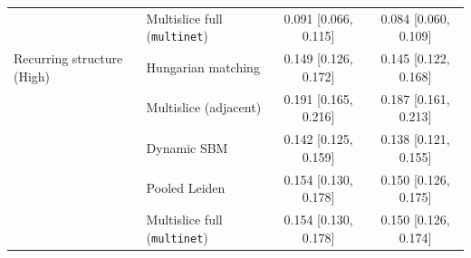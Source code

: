 \documentclass[11pt, letterpaper]{article}
\numberwithin{equation}{section}
\begin{document}
\begin{table}[htbp]
\begin{tabular}{llcc}
 & Multislice full (\texttt{multinet}) & 0.091 [0.066, 0.115] & 0.084 [0.060, 0.109] \\
Recurring structure (High) & Hungarian matching & 0.149 [0.126, 0.172] & 0.145 [0.122, 0.168] \\
 & Multislice (adjacent) & 0.191 [0.165, 0.216] & 0.187 [0.161, 0.213] \\
 & Dynamic SBM & 0.142 [0.125, 0.159] & 0.138 [0.121, 0.155] \\
 & Pooled Leiden & 0.154 [0.130, 0.178] & 0.150 [0.126, 0.175] \\
 & Multislice full (\texttt{multinet}) & 0.154 [0.130, 0.178] & 0.150 [0.126, 0.174] \\
\bottomrule
\end{tabular}
\end{table}
\end{document}
